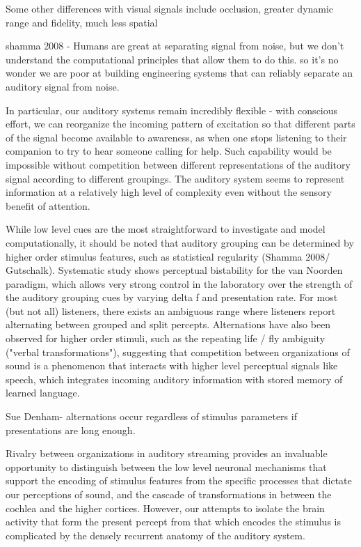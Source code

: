 Some other differences with visual signals include occlusion, greater dynamic range and fidelity, much less spatial 


shamma 2008 - Humans are great at separating signal from noise, but we don’t understand the computational principles that allow them to do this. so it’s no wonder we are poor at building engineering systems that can reliably separate an auditory signal from noise.

In particular, our auditory systems remain incredibly flexible - with conscious effort, we can reorganize the incoming pattern of excitation so that different parts of the signal become available to awareness, as when one stops listening to their companion to try to hear someone calling for help. Such capability would be impossible without competition between different representations of the auditory signal according to different groupings. The auditory system seems to represent information at a relatively high level of complexity even without the sensory benefit of attention.

While low level cues are the most straightforward to investigate and model computationally, it should be noted that auditory grouping can be determined by higher order stimulus features, such as statistical regularity (Shamma 2008/ Gutschalk). Systematic study shows perceptual bistability for the van Noorden paradigm, which allows very strong control in the laboratory over the strength of the auditory grouping cues by varying delta f and presentation rate. For most (but not all) listeners, there exists an ambiguous range where listeners report alternating between grouped and split percepts. Alternations have also been observed for higher order stimuli, such as the repeating life / fly ambiguity ("verbal transformations"), suggesting that competition between organizations of sound is a phenomenon that interacts with higher level perceptual signals like speech, which integrates incoming auditory information with stored memory of learned language.

Sue Denham- alternations occur regardless of stimulus parameters if presentations are long enough.

Rivalry between organizations in auditory streaming provides an invaluable opportunity to distinguish between the low level neuronal mechanisms that support the encoding of stimulus features from the specific processes that dictate our perceptions of sound, and the cascade of transformations in between the cochlea and the higher cortices. However, our attempts to isolate the brain activity that form the present percept from that which encodes the stimulus is complicated by the densely recurrent anatomy of the auditory system.

